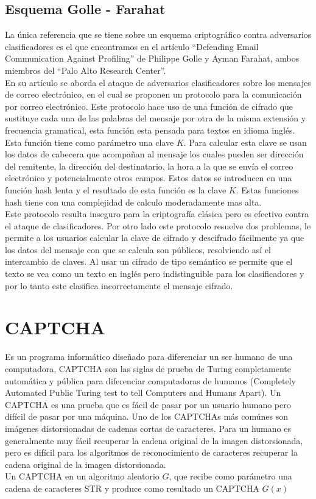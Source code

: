 \subsection{Esquema Golle - Farahat}
La  única  referencia  que se tiene  sobre  un  esquema  criptográfico  contra  adversarios clasificadores es el que encontramos en el artículo 
“Defending Email Communication Against Profiling” de Philippe Golle  y  Ayman  Farahat, ambos  miembros del 
“Palo Alto Research Center”.\cite{Attacks}\\
En su artículo se aborda el ataque de adversarios clasificadores sobre los mensajes de correo electrónico, en el cual se proponen un protocolo para la comunicación por correo electrónico. Este protocolo hace uso de una función  de cifrado que sustituye cada una de las palabras del mensaje por otra de la misma extensión y frecuencia gramatical, esta función esta pensada para textos en idioma ingl\'es. 
Esta función tiene como parámetro una clave $K$.  Para calcular esta clave se usan los datos de cabecera que acompañan al mensaje los cuales pueden ser dirección  del remitente, la dirección del destinatario, la hora a la que se envía el correo electrónico y potencialmente otros campos. Estos datos se introducen en una función hash lenta y el resultado de esta función es la clave $K$. Estas funciones hash  tiene con una complejidad de calculo moderadamente mas alta.  \\
Este  protocolo resulta inseguro para la criptografía clásica pero es efectivo contra el ataque de clasificadores. Por otro lado este protocolo resuelve dos problemas, le  permite  a los usuarios  calcular  la  clave de cifrado y descifrado  fácilmente  ya  que  los datos del mensaje con que se calcula son  públicos, resolviendo así el intercambio de claves. Al usar un cifrado de tipo semántico se permite que el texto se vea como un texto en inglés pero indistinguible para los clasificadores y por lo tanto este clasifica incorrectamente el mensaje cifrado.\\

\section{CAPTCHA}
 Es un programa informático diseñado para diferenciar un ser humano de una computadora, CAPTCHA son las siglas de prueba de Turing completamente automática y pública para diferenciar computadoras de humanos (Completely Automated Public Turing test to tell Computers and Humans Apart).  Un CAPTCHA es una prueba que es fácil de pasar por un usuario humano pero difícil de pasar por una máquina. Uno de los CAPTCHAs más com\'unes son imágenes distorsionadas de cadenas cortas de caracteres. Para un humano es generalmente muy fácil recuperar la cadena original de la imagen distorsionada, pero es difícil para  los algoritmos de reconocimiento de caracteres recuperar la cadena original de la imagen distorsionada.\\
Un CAPTCHA en un algoritmo aleatorio $G$, que recibe como parámetro una cadena de caracteres STR y produce como resultado un CAPTCHA $G(x)$\\

